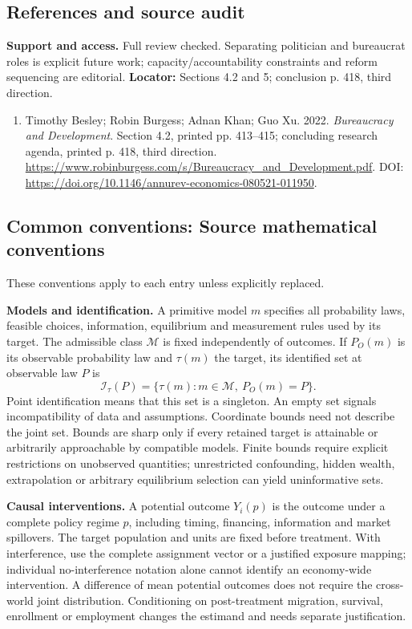 \documentclass[11pt,a4paper]{article}
\begin{document}
\subsection*{References and source audit}
\textbf{Support and access.} Full review checked. Separating politician and bureaucrat roles is explicit future work; capacity/accountability constraints and reform sequencing are editorial. \textbf{Locator:} Sections 4.2 and 5; conclusion p. 418, third direction.
\begin{enumerate}\raggedright
\item\hypertarget{definitions:source:30007663:1}{} Timothy Besley; Robin Burgess; Adnan Khan; Guo Xu. 2022. \emph{Bureaucracy and Development}. Section 4.2, printed pp. 413–415; concluding research agenda, printed p. 418, third direction.
\url{https://www.robinburgess.com/s/Bureaucracy_and_Development.pdf}.
DOI: \url{https://doi.org/10.1146/annurev-economics-080521-011950}.
\end{enumerate}

\subsection*{Common conventions: Source mathematical conventions}

These conventions apply to each entry unless explicitly replaced.

\textbf{Models and identification.} A primitive model \(m\) specifies all probability laws, feasible choices, information, equilibrium and measurement rules used by its target. The admissible class \(\mathcal M\) is fixed independently of outcomes. If \(P_O(m)\) is its observable probability law and \(\tau(m)\) the target, its identified set at observable law \(P\) is
\[
 \mathcal I_\tau(P)=\{\tau(m):m\in\mathcal M,\ P_O(m)=P\}.
\]
Point identification means that this set is a singleton. An empty set signals incompatibility of data and assumptions. Coordinate bounds need not describe the joint set. Bounds are sharp only if every retained target is attainable or arbitrarily approachable by compatible models. Finite bounds require explicit restrictions on unobserved quantities; unrestricted confounding, hidden wealth, extrapolation or arbitrary equilibrium selection can yield uninformative sets.

\textbf{Causal interventions.} A potential outcome \(Y_i(p)\) is the outcome under a complete policy regime \(p\), including timing, financing, information and market spillovers. The target population and units are fixed before treatment. With interference, use the complete assignment vector or a justified exposure mapping; individual no-interference notation alone cannot identify an economy-wide intervention. A difference of mean potential outcomes does not require the cross-world joint distribution. Conditioning on post-treatment migration, survival, enrollment or employment changes the estimand and needs separate justification.
\end{document}
